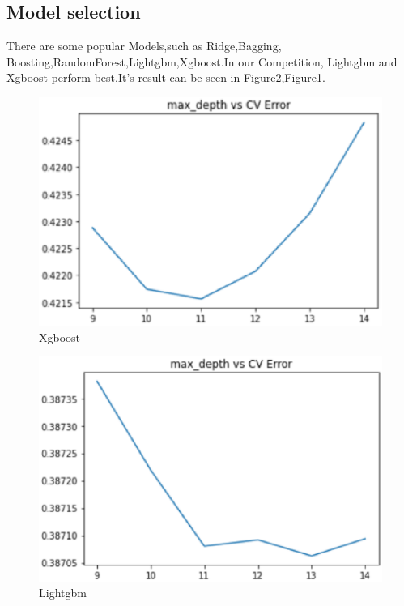 \subsection{Model selection}
There are some popular Models,such as Ridge,Bagging, Boosting,RandomForest,Lightgbm,Xgboost.In our Competition, Lightgbm and Xgboost perform best.It's result can be seen in Figure\ref{24},Figure\ref{20}.
\begin{figure}[htbp]
	\centering
	\includegraphics[scale=0.4]{figures/20.eps}
	\caption{ Xgboost } \label{20}
\end{figure}
\begin{figure}[htbp]
	\centering
	\includegraphics[scale=0.4]{figures/24.eps}
	\caption{Lightgbm } \label{24}
\end{figure}
%
%

